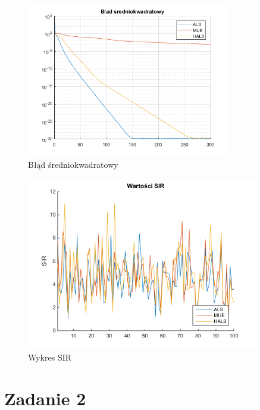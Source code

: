 \documentclass[11pt, a4paper]{article}
\begin{document}
\begin{figure}[H]
	\centering
	\includegraphics[width=0.80\textwidth]{./assets/wykres_zad1_mse.png}
	\caption{Błąd średniokwadratowy}
	\label{fig:wykres_zad1_mse}
\end{figure}

\begin{figure}[H]
	\centering
	\includegraphics[width=0.90\textwidth]{./assets/wykres_zad1_sir.png}
	\caption{Wykres SIR}
	\label{fig:wykres_zad1_sir}
\end{figure}


\section{Zadanie 2}
\end{document}
